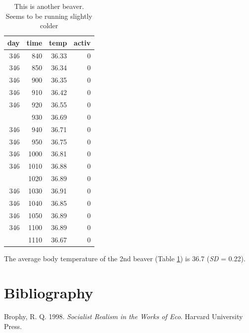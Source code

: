 \documentclass[12pt,english,a4paper,oneside,]{book} %
\theoremstyle{definition}
\theoremstyle{definition}
\theoremstyle{definition}
\theoremstyle{remark}
\begin{document}
\begin{table}

\caption{\label{tab:beaver-1}This is another beaver. Seems to be running slightly colder}
\centering
\begin{tabular}[t]{rrrr}
\toprule
day & time & temp & activ\\
\midrule
346 & 840 & 36.33 & 0\\
346 & 850 & 36.34 & 0\\
346 & 900 & 36.35 & 0\\
346 & 910 & 36.42 & 0\\
346 & 920 & 36.55 & 0\\
\addlinespace
346 & 930 & 36.69 & 0\\
346 & 940 & 36.71 & 0\\
346 & 950 & 36.75 & 0\\
346 & 1000 & 36.81 & 0\\
346 & 1010 & 36.88 & 0\\
\addlinespace
346 & 1020 & 36.89 & 0\\
346 & 1030 & 36.91 & 0\\
346 & 1040 & 36.85 & 0\\
346 & 1050 & 36.89 & 0\\
346 & 1100 & 36.89 & 0\\
\addlinespace
346 & 1110 & 36.67 & 0\\
\bottomrule
\end{tabular}
\end{table}

The average body temperature of the 2nd beaver (Table \ref{tab:beaver-1}) is 36.7 (\emph{SD} = 0.22).

\backmatter

\hypertarget{bibliography}{%
\chapter*{Bibliography}\label{bibliography}}

\begingroup
\hspace{\parindent}
\setlength{\parindent}{-0.25in}
\setlength{\leftskip}{0.25in}
\setlength{\parskip}{0pt}

\hypertarget{refs}{}
\leavevmode\hypertarget{ref-Brophy1998}{}%
Brophy, R. Q. 1998. \emph{Socialist Realism in the Works of Eco}. Harvard University Press.
\end{document}
